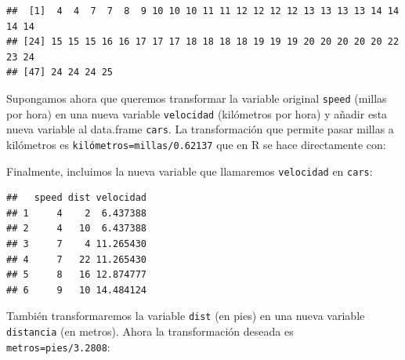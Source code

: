 \documentclass[]{book}
\newenvironment{Shaded}{\begin{snugshade}}{\end{snugshade}}
\newcommand{\KeywordTok}[1]{\textcolor[rgb]{0.13,0.29,0.53}{\textbf{#1}}}
\newcommand{\FloatTok}[1]{\textcolor[rgb]{0.00,0.00,0.81}{#1}}
\newcommand{\StringTok}[1]{\textcolor[rgb]{0.31,0.60,0.02}{#1}}
\newcommand{\OperatorTok}[1]{\textcolor[rgb]{0.81,0.36,0.00}{\textbf{#1}}}
\newcommand{\NormalTok}[1]{#1}
\begin{document}
\begin{verbatim}
##  [1]  4  4  7  7  8  9 10 10 10 11 11 12 12 12 12 13 13 13 13 14 14 14 14
## [24] 15 15 15 16 16 17 17 17 18 18 18 18 19 19 19 20 20 20 20 20 22 23 24
## [47] 24 24 24 25
\end{verbatim}

Supongamos ahora que queremos transformar la variable original
\texttt{speed} (millas por hora) en una nueva variable
\texttt{velocidad} (kilómetros por hora) y añadir esta nueva variable al
data.frame \texttt{cars}. La transformación que permite pasar millas a
kilómetros es \texttt{kilómetros=millas/0.62137} que en R se hace
directamente con:

\begin{Shaded}
\end{Shaded}

Finalmente, incluimos la nueva variable que llamaremos
\texttt{velocidad} en \texttt{cars}:

\begin{Shaded}
\end{Shaded}

\begin{verbatim}
##   speed dist velocidad
## 1     4    2  6.437388
## 2     4   10  6.437388
## 3     7    4 11.265430
## 4     7   22 11.265430
## 5     8   16 12.874777
## 6     9   10 14.484124
\end{verbatim}

También transformaremos la variable \texttt{dist} (en pies) en una nueva
variable \texttt{distancia} (en metros). Ahora la transformación deseada
es \texttt{metros=pies/3.2808}:

\begin{Shaded}
\end{Shaded}
\end{document}
